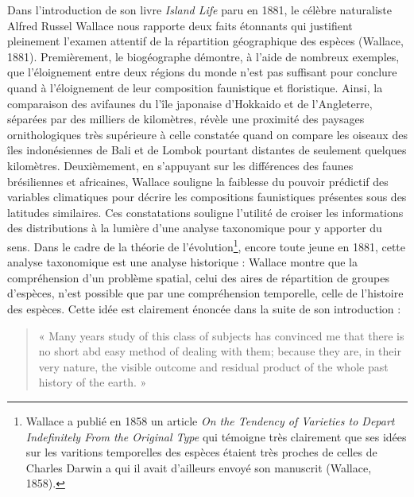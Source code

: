 Dans l'introduction de son livre \emph{Island Life} paru en 1881, le
célèbre naturaliste Alfred Russel Wallace nous rapporte deux faits
étonnants qui justifient pleinement l'examen attentif de la répartition
géographique des espèces (Wallace, 1881). Premièrement, le biogéographe
démontre, à l'aide de nombreux exemples, que l'éloignement entre deux
régions du monde n'est pas suffisant pour conclure quand à l'éloignement
de leur composition faunistique et floristique. Ainsi, la comparaison
des avifaunes du l'île japonaise d'Hokkaido et de l'Angleterre, séparées
par des milliers de kilomètres, révèle une proximité des paysages
ornithologiques très supérieure à celle constatée quand on compare les
oiseaux des îles indonésiennes de Bali et de Lombok pourtant distantes
de seulement quelques kilomètres. Deuxièmement, en s'appuyant sur les
différences des faunes brésiliennes et africaines, Wallace souligne la
faiblesse du pouvoir prédictif des variables climatiques pour décrire
les compositions faunistiques présentes sous des latitudes similaires.
Ces constatations souligne l'utilité de croiser les informations des
distributions à la lumière d'une analyse taxonomique pour y apporter du
sens. Dans le cadre de la théorie de l'évolution\footnote{Wallace a
  publié en 1858 un article \emph{On the Tendency of Varieties to Depart
  Indefinitely From the Original Type} qui témoigne très clairement que
  ses idées sur les varitions temporelles des espèces étaient très
  proches de celles de Charles Darwin a qui il avait d'ailleurs envoyé
  son manuscrit (Wallace, 1858).}, encore toute jeune en 1881, cette
analyse taxonomique est une analyse historique : Wallace montre que la
compréhension d'un problème spatial, celui des aires de répartition de
groupes d'espèces, n'est possible que par une compréhension temporelle,
celle de l'histoire des espèces. Cette idée est clairement énoncée dans
la suite de son introduction :

\begin{quote}
« Many years study of this class of subjects has convinced me that there
is no short abd easy method of dealing with them; because they are, in
their very nature, the visible outcome and residual product of the whole
past history of the earth. »
\end{quote}

